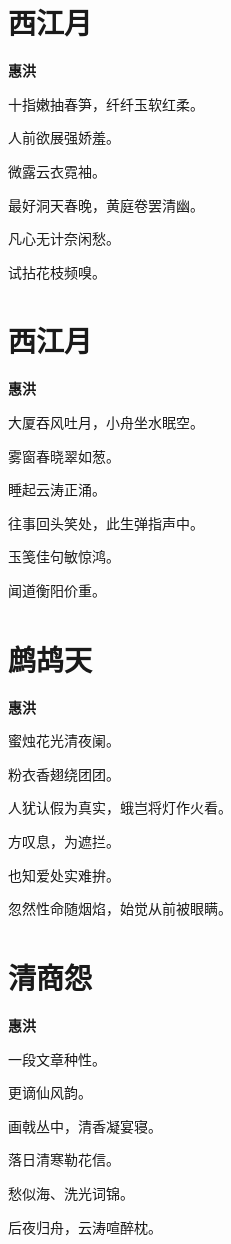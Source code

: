 \documentclass[12pt,a4paper]{ctexbook}
\begin{document}
\section{西江月}
\textbf{惠洪}\par\vspace{0.5em}
十指嫩抽春笋，纤纤玉软红柔。\par
人前欲展强娇羞。\par
微露云衣霓袖。\par
最好洞天春晚，黄庭卷罢清幽。\par
凡心无计奈闲愁。\par
试拈花枝频嗅。\par

\section{西江月}
\textbf{惠洪}\par\vspace{0.5em}
大厦吞风吐月，小舟坐水眠空。\par
雾窗春晓翠如葱。\par
睡起云涛正涌。\par
往事回头笑处，此生弹指声中。\par
玉笺佳句敏惊鸿。\par
闻道衡阳价重。\par

\section{鹧鸪天}
\textbf{惠洪}\par\vspace{0.5em}
蜜烛花光清夜阑。\par
粉衣香翅绕团团。\par
人犹认假为真实，蛾岂将灯作火看。\par
方叹息，为遮拦。\par
也知爱处实难拚。\par
忽然性命随烟焰，始觉从前被眼瞒。\par

\section{清商怨}
\textbf{惠洪}\par\vspace{0.5em}
一段文章种性。\par
更谪仙风韵。\par
画戟丛中，清香凝宴寝。\par
落日清寒勒花信。\par
愁似海、洗光词锦。\par
后夜归舟，云涛喧醉枕。\par
\end{document}
